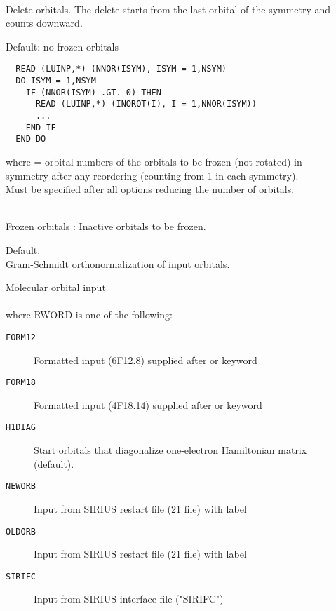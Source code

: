 \begin{description}
\item[]
   \\ 
  Delete orbitals. The delete starts from the
  last orbital of the symmetry and counts downward.

\item[]
  Default: no frozen orbitals
\begin{verbatim}
  READ (LUINP,*) (NNOR(ISYM), ISYM = 1,NSYM)
  DO ISYM = 1,NSYM
    IF (NNOR(ISYM) .GT. 0) THEN
      READ (LUINP,*) (INOROT(I), I = 1,NNOR(ISYM))
      ...
    END IF
  END DO
\end{verbatim}
  where  = orbital numbers of the orbitals to be
          frozen
          (not rotated) in symmetry 
          after any reordering (counting from 1 in each symmetry).\\
  Must be specified after all options reducing the number of orbitals.

\item[]
   \\
  Frozen orbitals : Inactive orbitals to be frozen.
 
\item[]
  Default.\\
  Gram-Schmidt orthonormalization of input orbitals.
 
\item[]
   Molecular orbital input\\
    \\
   where RWORD is one of the following:
   \begin{description}
   \item[{\tt FORM12\ }] Formatted input (6F12.8)  supplied after
         or  keyword
   \item[{\tt FORM18\ }] Formatted input (4F18.14) supplied after
         or  keyword
   \item[{\tt H1DIAG\ }] Start orbitals that diagonalize
                            one-electron Hamiltonian matrix (default).
   \item[{\tt NEWORB\ }] Input from SIRIUS restart file
                            (\f{21} file) with label 
   \item[{\tt OLDORB\ }] Input from SIRIUS restart file
                            (\f{21} file) with label 
   \item[{\tt SIRIFC\ }] Input from SIRIUS interface file ("SIRIFC")
   \end{description}
 

\end{description}
